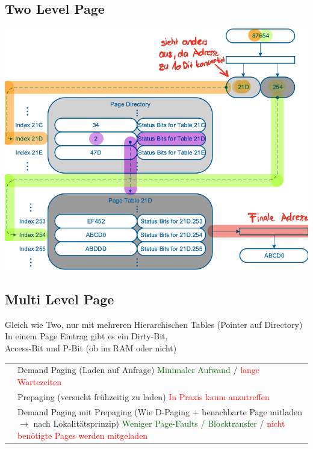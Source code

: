 \documentclass[8pt,landscape,a4paper]{scrartcl}
\begin{document}
\begin{multicols*}{5}
\subsection{Two Level Page}
\begin{center}
	\includegraphics[scale=.22]{Graphic/TwoLevelPage}
\end{center}\vspace{-10pt}
\subsection{Multi Level Page}
Gleich wie Two, nur mit mehreren Hierarchischen Tables (Pointer auf Directory)\\
In einem Page Eintrag gibt es ein \textcolor{b}{Dirty}-Bit,\\
\textcolor{b}{Access}-Bit und \textcolor{b}{P}-Bit (ob im RAM oder nicht)\\
\vspace{-15pt}
\begin{center}
	\begin{tabular}{p{.1mm}|p{4.8cm}}
		\parbox[t]{1mm}{} 
		&\textcolor{b}{Demand Paging} (Laden auf Anfrage)
		\textcolor{darkgreen}{Minimaler Aufwand} / \textcolor{red}{lange Wartezeiten}\\
		
		&\textcolor{b}{Prepaging} (versucht frühzeitig zu laden)
		\textcolor{red}{In Praxis kaum anzutreffen}\\
	
		&\textcolor{b}{Demand Paging mit Prepaging} (Wie D-Paging $+$ benachbarte Page mitladen $\rightarrow$ nach Lokalitätsprinzip) \textcolor{darkgreen}{Weniger Page-Faults / Blocktransfer} / \textcolor{red}{nicht benötigte Pages  werden mitgeladen}\\
		\hline
		

\end{tabular}
\end{center}
\end{multicols*}
\end{document}
